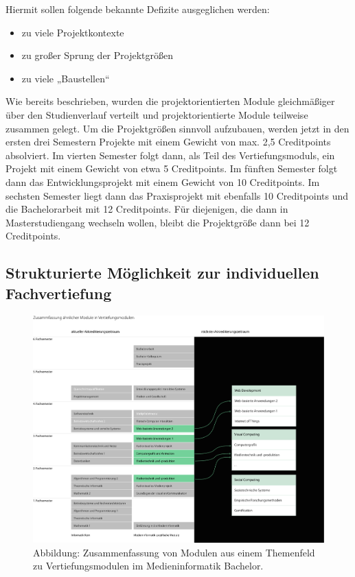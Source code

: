 Hiermit sollen folgende bekannte Defizite ausgeglichen werden:

\begin{itemize}
\tightlist
\item
  zu viele Projektkontexte
\item
  zu großer Sprung der Projektgrößen
\item
  zu viele „Baustellen``
\end{itemize}

Wie bereits beschrieben, wurden die projektorientierten Module
gleichmäßiger über den Studienverlauf verteilt und projektorientierte
Module teilweise zusammen gelegt. Um die Projektgrößen sinnvoll
aufzubauen, werden jetzt in den ersten drei Semestern Projekte mit einem
Gewicht von max. 2,5 Creditpoints absolviert. Im vierten Semester folgt
dann, als Teil des Vertiefungsmoduls, ein Projekt mit einem Gewicht von
etwa 5 Creditpoints. Im fünften Semester folgt dann das
Entwicklungsprojekt mit einem Gewicht von 10 Creditpoints. Im sechsten
Semester liegt dann das Praxisprojekt mit ebenfalls 10 Creditpoints und
die Bachelorarbeit mit 12 Creditpoints. Für diejenigen, die dann in
Masterstudiengang wechseln wollen, bleibt die Projektgröße dann bei 12
Creditpoints.

\subsection{Strukturierte Möglichkeit zur individuellen
Fachvertiefung}\label{strukturierte-muxf6glichkeit-zur-individuellen-fachvertiefung}

\begin{figure}[htbp]
\centering
\includegraphics[width=\columnwidth]{../anhaenge/bilder/ba-vertiefungen.pdf}
\caption{Abbildung: Zusammenfassung von Modulen aus einem Themenfeld zu
Vertiefungsmodulen im Medieninformatik Bachelor.}
\end{figure}

